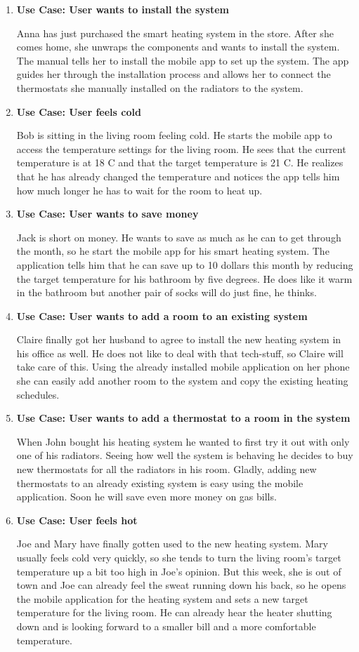 \begin{enumerate}
\item \textbf{Use Case: User wants to install the system}

Anna has just purchased the smart heating system in the store. After she comes home, she unwraps the components and wants to install the system. The manual tells her to install the mobile app to set up the system. The app guides her through the installation process and allows her to connect the thermostats she manually installed on the radiators to the system.
\item \textbf{Use Case: User feels cold}

Bob is sitting in the living room feeling cold. He starts the mobile app to access the temperature settings for the living room. He sees that the current temperature is at 18 C and that the target temperature is 21 C. He realizes that he has already changed the temperature and notices the app tells him how much longer he has to wait for the room to heat up.
\item \textbf{Use Case: User wants to save money}

Jack is short on money. He wants to save as much as he can to get through the month, so he start the mobile app for his smart heating system. The application tells him that he can save up to 10 dollars this month by reducing the target temperature for his bathroom by five degrees. He does like it warm in the bathroom but another pair of socks will do just fine, he thinks.
\item \textbf{Use Case: User wants to add a room to an existing system}

Claire finally got her husband to agree to install the new heating system in his office as well. He does not like to deal with that tech-stuff, so Claire will take care of this. Using the already installed mobile application on her phone she can easily add another room to the system and copy the existing heating schedules.
\item \textbf{Use Case: User wants to add a thermostat to a room in the system}

When John bought his heating system he wanted to first try it out with only one of his radiators. Seeing how well the system is behaving he decides to buy new thermostats for all the radiators in his room. Gladly, adding new thermostats to an already existing system is easy using the mobile application. Soon he will save even more money on gas bills.
\item \textbf{Use Case: User feels hot}

Joe and Mary have finally gotten used to the new heating system. Mary usually feels cold very quickly, so she tends to turn the living room's target temperature up a bit too high in Joe's opinion. But this week, she is out of town and Joe can already feel the sweat running down his back, so he opens the mobile application for the heating system and sets a new target temperature for the living room. He can already hear the heater shutting down and is looking forward to a smaller bill and a more comfortable temperature.
\end{enumerate}

